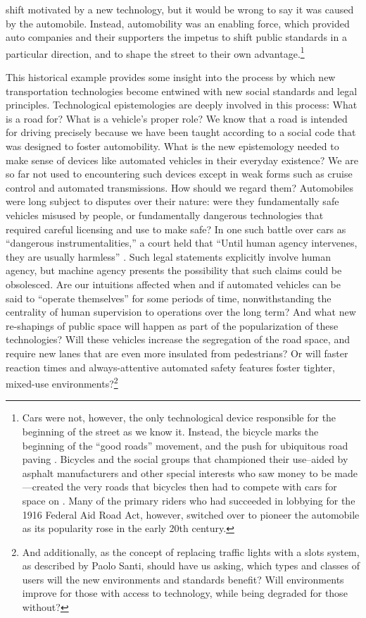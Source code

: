 shift motivated by a new technology, but it would be wrong to say it
was caused by the automobile. Instead, automobility was an enabling
force, which provided auto companies and their supporters the impetus
to shift public standards in a particular direction, and to shape the
street to their own advantage.\footnote{Cars were not, however, the
  only technological device responsible for 
the beginning of the street as we know it. Instead, the bicycle marks the
beginning of the ``good roads'' movement, and the push for ubiquitous
road
paving \cite{voxCycle}.
Bicycles and the social groups that championed their use--aided by
asphalt manufacturers and other special interests who saw money to be
made---created the 
very roads that bicycles then had to compete with cars for space on
\cite{voxCycle}. Many of the primary riders who had succeeded in lobbying for
the 1916 Federal Aid Road Act, however, switched over to pioneer the
automobile as its popularity rose in the early 20th century.} 

This historical
example provides some insight into the process by which new
transportation technologies become entwined with new social standards
and legal principles. Technological epistemologies are deeply involved
in this process: What is a road for? What is a vehicle's
proper role? We know that a road is intended for driving precisely
because we have been taught according to a social code that was
designed to foster automobility. What is the new epistemology needed
to make sense of devices like 
automated vehicles in their everyday existence? We are so far not
used to encountering such devices
except in weak forms such as cruise control and automated
transmissions. How should we regard them?
Automobiles were long subject to disputes over their nature: were they
fundamentally safe vehicles misused by people, or fundamentally
dangerous technologies that required careful licensing and use to
make safe? In one such battle over cars as ``dangerous
instrumentalities,'' a court held that ``Until human agency
intervenes, they are usually 
harmless'' \cite[p. 70]{lochlannjain}. Such legal statements
explicitly involve human agency, but machine agency presents the
possibility that such claims could be obsolesced. Are our intuitions
affected when and if automated vehicles can be said to ``operate
themselves'' for some periods of time, nonwithstanding the centrality
of human supervision to operations over the long term?
And what new re-shapings of public space will happen as part of the 
popularization of these technologies? Will these vehicles increase the
segregation of the road space, and require new lanes that are even
more insulated from pedestrians? Or will faster reaction times and
always-attentive automated safety features foster tighter, mixed-use
environments?\footnote{And additionally, as the concept of replacing traffic
lights with a slots system, as described by Paolo Santi, should have
us asking, which types and classes of users will the new environments
and standards benefit? Will environments improve for those with access
to technology, while being degraded for those without?}


